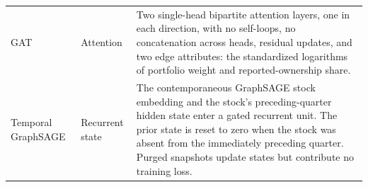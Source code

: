 \begin{longtable}{>{\raggedright\arraybackslash}p{}>{\raggedright\arraybackslash}p{}>{\raggedright\arraybackslash}p{}}
        GAT
              & Attention
              & Two single-head bipartite attention layers, one in each direction, with no self-loops, no concatenation across heads, residual updates, and two edge attributes: the standardized logarithms of portfolio weight and reported-ownership share.                                                                                                                                                                                                                                                                                  \\
        Temporal GraphSAGE
              & Recurrent state
              & The contemporaneous GraphSAGE stock embedding and the stock's preceding-quarter hidden state enter a gated recurrent unit. The prior state is reset to zero when the stock was absent from the immediately preceding quarter. Purged snapshots update states but contribute no training loss.                                                                                                                                                                                                                                     \\
\end{longtable}
\endgroup
